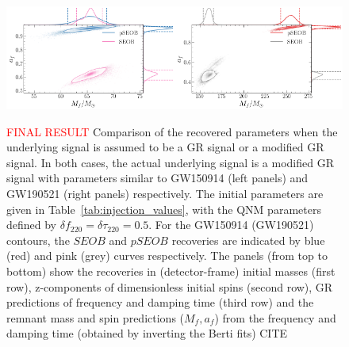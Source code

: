 \documentclass[twocolumn,prd,superscriptaddress,amsfonts,amssymb,amsmath,preprintnumbers]{revtex4-1}
\newcommand{\df}[1]{\delta f_{\text{#1}}}
\newcommand{\dtau}[1]{\delta \tau_{\text{#1}}}
\begin{document}
\begin{figure}[h!]
	\includegraphics[width=0.5\textwidth]{figures/GW150914_simulated_signal_0p5_gr_ngr_Mfaf.png}\includegraphics[width=0.5\textwidth]{figures/GW190521_simulated_signal_0p5_gr_ngr_Mfaf.png}
	\caption{\textcolor{red}{FINAL RESULT} Comparison of the recovered parameters when the underlying signal is assumed to be a GR signal or a modified GR signal. In both cases, the actual underlying signal is a modified GR signal with parameters similar to GW150914 (left panels) and GW190521 (right panels) respectively. The initial parameters are given in Table~\ref{tab:injection_values}, with the QNM parameters defined by $\df{220} = \dtau{220} = 0.5$. For the GW150914 (GW190521) contours, the $SEOB$ and $pSEOB$ recoveries are indicated by blue (red) and pink (grey) curves respectively. The panels (from top to bottom) show the recoveries in (detector-frame) initial masses (first row), z-components of dimensionless initial spins (second row), GR predictions of frequency and damping time (third row) and the remnant mass and spin predictions ($M_f, a_f$) from the frequency and damping time (obtained by inverting the Berti fits) CITE}
	\label{fig:gr_ngr_comparison}
\end{figure}


%


\end{document}
